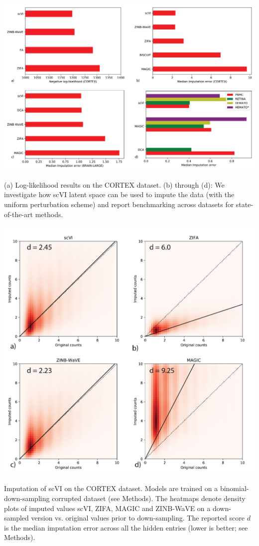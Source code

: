 \begin{suppfigure}[p]
\includegraphics[width=\textwidth]{figures/loglik_imputation_supplement.png}
\caption[Log-likelihood and imputation results]{(a) Log-likelihood results on the CORTEX dataset. (b) through (d): We investigate how scVI latent space can be used to impute the data (with the uniform perturbation scheme) and report benchmarking across datasets for state-of-the-art methods.}
\label{scvilog_imputation_supp}
\end{suppfigure}


\begin{suppfigure}[p]
\includegraphics[width=\textwidth]{figures/Figure-3_non_unif.png}
\caption[Non-uniform imputation of scVI on the CORTEX dataset]{Imputation of scVI on the CORTEX dataset. Models are trained on a binomial-down-sampling corrupted dataset (see Methods).  The heatmaps denote density plots of imputed values scVI, ZIFA, MAGIC and ZINB-WaVE on a down-sampled version vs. original values prior to down-sampling. The reported score $d$ is the median imputation error across all the hidden entries (lower is better; see Methods).}
\label{scvilog_imputation_non_unif}
\end{suppfigure}

